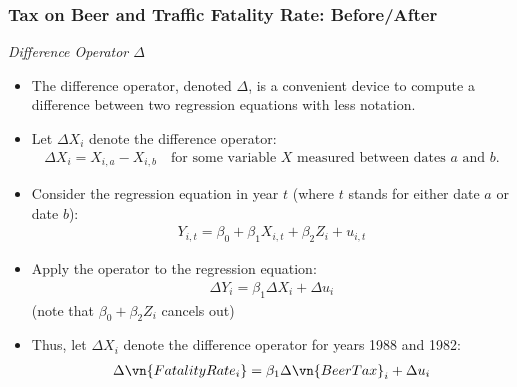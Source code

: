 \begin{frame}
\frametitle{Tax on Beer and Traffic Fatality Rate: Before/After}
\emph{Difference Operator $\Delta$}
\begin{itemize}
\item The difference operator, denoted $\Delta$, is a convenient device to compute a difference between two regression equations with less notation.
\item Let $\Delta X_{i}$ denote the difference operator:
\begin{align*}
\Delta X_{i} = X_{i,a}-X_{i,b} \quad\text{for some variable $X$ measured between dates $a$ and $b$.}
\end{align*}
\item Consider the regression equation in year $t$ (where $t$ stands for either date $a$ or date $b$):
\begin{align*}
Y_{i,t} = \beta_{0} + \beta_{1} X_{i,t} + \beta_{2} Z_{i} + u_{i,t}
\end{align*}
\item Apply the operator to the regression equation:
\begin{align*}
\Delta Y_{i} = \beta_{1} \Delta X_{i} + \Delta u_{i}
\end{align*}
(note that $\beta_{0}+\beta_{2}Z_{i}$ cancels out)
\item Thus, let $\Delta X_{i}$ denote the difference operator for years 1988 and 1982:
\begin{align*}
\Delta \vn{FatalityRate_{i}}
  = \beta_{1}\Delta\vn{BeerTax}_{i} + \Delta u_{i}
\end{align*}
\end{itemize}
\end{frame}


